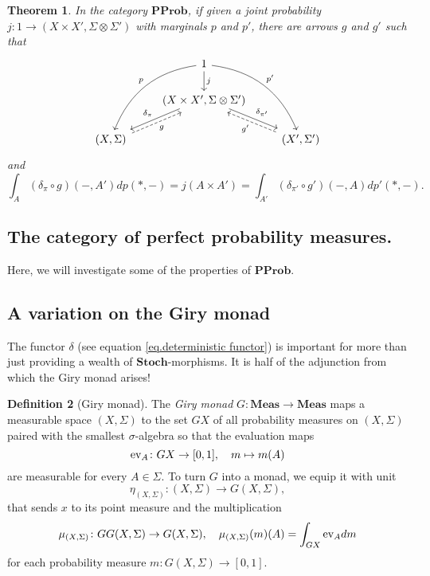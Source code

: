 \documentclass[11pt]{amsart}
\newcommand{\cat}[1]{\mathbf{#1}}
\newcommand{\ev}{\textup{ev}}
\newcommand{\from}{\colon}
\newtheorem{thm}{Theorem}[section]
\theoremstyle{remark}
\theoremstyle{definition}
\newtheorem{defn}[thm]{Definition}
\begin{document}
\begin{thm} \label{thm.marginals factr thru product}
In the category $\cat{PProb}$, if given a 
joint probability $j \from 1 \to (X 
\times X',\Sigma \otimes \Sigma')$ with 
marginals $p$ and $p'$, there are 
arrows $g$ and $g'$ such that
\[
\begin{tikzcd}
{} & 
{1} \ar[d,"j"] \ar[ddl,swap,bend right=30,"p"] \ar[ddr,bend left=30,"p'"] & 
{} \\
{} & 
{(X \times X',\Sigma \otimes \Sigma')} \ar[dl,swap,shift right=.75,"\delta_{\pi}"] \ar[dr,shift left=.75,"\delta_{\pi'}"] & 
{} \\
{(X,\Sigma)} \ar[ur,dashed,shift 
right=.75,swap,"g"] & 
{} & 
{(X',\Sigma')} \ar[ul,dashed, shift 
left=.75,"g'" ]
\end{tikzcd}
\]
and
\[
	\int_A (\delta_\pi \circ g)(-,A')dp(\ast,-)
		= j(A \times A')
		= \int_{A'} (\delta_{\pi'} \circ 
		g')(-,A)dp'(\ast,-).
\]
\end{thm}

\subsection{The category of perfect probability measures.}

Here, we will investigate some of the properties of $\cat{PProb}$.  


\subsection{A variation on the Giry monad} \label{subsec.giry monad}

The functor $\delta$ (see equation \eqref{eq.deterministic functor}) is important for more than just providing a wealth of $\cat{Stoch}$-morphisms.  It is half of the adjunction from which the Giry monad arises! 

\begin{defn}[Giry monad]
	The \emph{Giry monad} $G \from \cat{Meas} \to \cat{Meas}$ maps a measurable space $(X,\Sigma)$ to the set $GX$ of all probability measures on $(X,\Sigma)$ paired with the smallest $\sigma$-algebra so that the evaluation maps
	\[
	\ev_A \from GX \to [0,1], \quad m \mapsto m(A)
	\]
	are measurable for every $A \in \Sigma$. To turn $G$ into a monad, we equip it with unit
	\[
	\eta_{(X,\Sigma)} \from (X,\Sigma) \to G(X,\Sigma),
	\] 
	that sends $x$ to its point measure and the multiplication 
	\[
	\mu_{(X,\Sigma)} \from GG(X,\Sigma) \to G(X,\Sigma),\quad
	\mu_{(X,\Sigma)}(m)(A) = \int_{GX} \ev_A dm
	\] 
	for each probability measure $m \from G(X,\Sigma) \to [0,1]$.
\end{defn}
\end{document}
